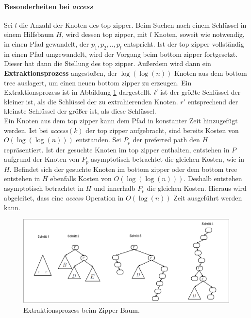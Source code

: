 \documentclass[a4paper,12pt]{article}
\begin{document}
\paragraph{Besonderheiten bei \textit{access}}
Sei $l$ die Anzahl der Knoten des top zipper.
Beim Suchen nach einem Schlüssel in einem Hilfsbaum $H$, wird dessen top zipper, mit $l$ Knoten, soweit wie notwendig, in einen Pfad gewandelt, der $p_1, p_2, .., p_l$ entspricht. Ist der top zipper vollständig in einen Pfad umgewandelt, wird der Vorgang beim bottom zipper fortgesetzt. Dieser hat dann die Stellung des top zipper. Außerdem wird dann ein \textbf{Extraktionsprozess} angestoßen, der $\log\left(\log\left(n\right)\right)$ Knoten aus dem bottom tree auslagert, um einen neuen bottom zipper zu erzeugen. Ein Extraktionsprozess ist in Abbildung \ref{fig:extractHybrid} dargestellt. $l'$ ist der größte Schlüssel der kleiner ist, als die Schlüssel der zu extrahierenden Knoten. $r'$ entsprechend der kleinste Schlüssel der größer ist, als diese Schlüssel.  \\
Ein Knoten aus dem top zipper kann dem Pfad in konstanter Zeit hinzugefügt werden. Ist bei \textit{access}$\left(k\right)$ der top zipper aufgebracht, sind bereits Kosten von $O\left(\log\left(\log\left(n\right)\right)\right)$ entstanden. Sei $P_p$ der preferred path den $H$ repräsentiert. Ist der gesuchte Knoten im top zipper enthalten, entstehen in $P$ aufgrund der Knoten von $P_p$ asymptotisch betrachtet die gleichen Kosten, wie in $H$. Befindet sich der gesuchte Knoten im bottom zipper oder dem bottom tree entstehen in $H$ ebenfalls Kosten von  $O\left(\log\left(\log\left(n\right)\right)\right)$. Deshalb entstehen asymptotisch betrachtet in $H$ und innerhalb $P_p$ die gleichen Kosten. Hieraus wird abgeleitet, dass eine \textit{access} Operation in $O\left(\log\left(n\right)\right)$ Zeit ausgeführt werden kann.


\begin{figure}[H]
	\centering
	\includegraphics[height= 0.5\textwidth]{"Medien/Zipper/hybrid/extractHybrid"}
	\caption{Extraktionsprozess beim Zipper Baum. }
	\label{fig:extractHybrid}
\end{figure}
\end{document}
